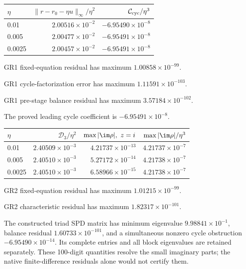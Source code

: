 \begin{center}\begin{tabular}{@{}lrr@{}}
\toprule
\(\eta\) & \(\|r-r_0-\eta u\|_\infty/\eta^2\) & \(\mathcal C_{\rm cyc}/\eta^3\)\\\midrule
0.01 & \(2.00516\times10^{-2}\) & \(-6.95490\times10^{-8}\)\\
0.005 & \(2.00477\times10^{-2}\) & \(-6.95491\times10^{-8}\)\\
0.0025 & \(2.00457\times10^{-2}\) & \(-6.95491\times10^{-8}\)\\
\bottomrule\end{tabular}\end{center}

GR1 fixed-equation residual has maximum \(1.00858\times10^{-99}\).

GR1 cycle-factorization error has maximum \(1.11591\times10^{-103}\).

GR1 pre-stage balance residual has maximum \(3.57184\times10^{-102}\).

The proved leading cycle coefficient is \(-6.95491\times10^{-8}\).

\begin{center}\begin{tabular}{@{}lrrr@{}}
\toprule
\(\eta\) & \(\mathcal D_3/\eta^2\) & \(\max|\im\rho|,\ z=i\) & \(\max|\im\rho|/\eta^3\)\\\midrule
0.01 & \(2.40509\times10^{-3}\) & \(4.21737\times10^{-13}\) & \(4.21737\times10^{-7}\)\\
0.005 & \(2.40510\times10^{-3}\) & \(5.27172\times10^{-14}\) & \(4.21738\times10^{-7}\)\\
0.0025 & \(2.40510\times10^{-3}\) & \(6.58966\times10^{-15}\) & \(4.21738\times10^{-7}\)\\
\bottomrule\end{tabular}\end{center}

GR2 fixed-equation residual has maximum \(1.01215\times10^{-99}\).

GR2 characteristic residual has maximum \(1.82317\times10^{-101}\).

The constructed triad SPD matrix has minimum eigenvalue \(9.98841\times10^{-1}\), balance residual \(1.60733\times10^{-101}\), and a simultaneous nonzero cycle obstruction \(-6.95490\times10^{-14}\). Its complete entries and all block eigenvalues are retained separately. These 100-digit quantities resolve the small imaginary parts; the native finite-difference residuals alone would not certify them.

